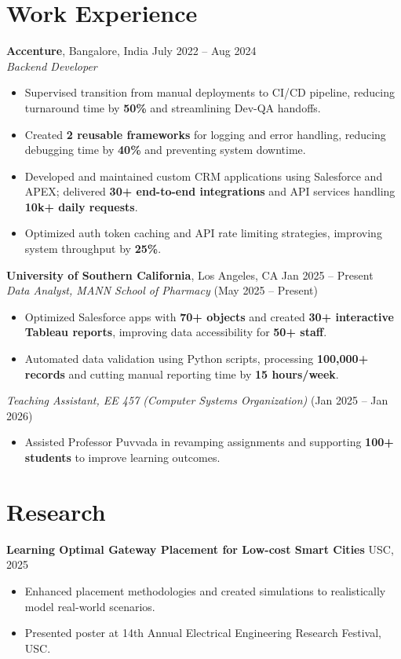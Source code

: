 \documentclass[letterpaper,10pt]{article}
\begin{document}
\section*{Work Experience}
\textbf{Accenture}, Bangalore, India \hfill July 2022 -- Aug 2024 \\
\textit{Backend Developer}
\begin{itemize}
    \item Supervised transition from manual deployments to CI/CD pipeline, reducing turnaround time by \textbf{50\%} and streamlining Dev-QA handoffs.
    \item Created \textbf{2 reusable frameworks} for logging and error handling, reducing debugging time by \textbf{40\%} and preventing system downtime.
    \item Developed and maintained custom CRM applications using Salesforce and APEX; delivered \textbf{30+ end-to-end integrations} and API services handling \textbf{10k+ daily requests}.
    \item Optimized auth token caching and API rate limiting strategies, improving system throughput by \textbf{25\%}.
\end{itemize}

\textbf{University of Southern California}, Los Angeles, CA \hfill Jan 2025 -- Present \\
\textit{Data Analyst, MANN School of Pharmacy} \hfill (May 2025 -- Present)
\begin{itemize}
    \item Optimized Salesforce apps with \textbf{70+ objects} and created \textbf{30+ interactive Tableau reports}, improving data accessibility for \textbf{50+ staff}.
    \item Automated data validation using Python scripts, processing \textbf{100,000+ records} and cutting manual reporting time by \textbf{15 hours/week}.
\end{itemize}

\textit{Teaching Assistant, EE 457 (Computer Systems Organization)} \hfill (Jan 2025 -- Jan 2026)
\begin{itemize}
    \item Assisted Professor Puvvada in revamping assignments and supporting \textbf{100+ students} to improve learning outcomes.
\end{itemize}

\section*{Research}
    \textbf{Learning Optimal Gateway Placement for Low-cost Smart Cities} \hfill USC, 2025
    \begin{itemize}
        \item Enhanced placement methodologies and created simulations to realistically model real-world scenarios.
        \item Presented poster at 14th Annual Electrical Engineering Research Festival, USC.
    \end{itemize}
    
\end{document}
